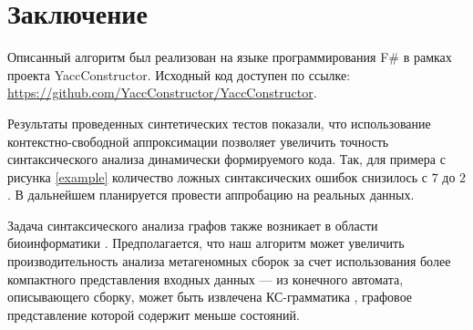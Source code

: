 \section{Заключение}

Описанный алгоритм был реализован на языке программирования F$\#$ в рамках проекта YaccConstructor. Исходный код доступен по ссылке: \url{ https://github.com/YaccConstructor/YaccConstructor}. 

Результаты проведенных синтетических тестов показали, что использование контекстно-свободной аппроксимации позволяет увеличить точность синтаксического анализа динамически формируемого кода. Так, для примера с рисунка \ref{example} количество ложных синтаксических ошибок снизилось с $7$ до $2$. 
В дальнейшем планируется провести аппробацию на реальных данных.

Задача синтаксического анализа графов также возникает в области биоинформатики \cite{kovalev-spbu-gll_reg}. 
Предполагается, что наш алгоритм может увеличить производительность анализа метагеномных сборок за счет использования более компактного представления входных данных --- из конечного автомата, описывающего сборку, может быть извлечена КС-грамматика \cite{kovalev-spbu-cf_extr}, графовое представление которой содержит меньше состояний.